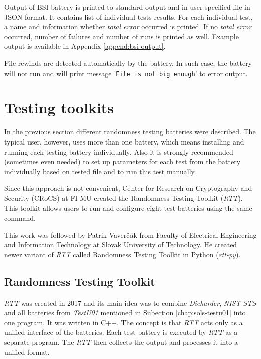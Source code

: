 \documentclass[
  digital,     %
  oneside,     %
  nosansbold,  %
  nocolorbold, %
  nolof,         %
  nolot,         %
]{fithesis4}
\begin{document}
Output of BSI battery is printed to standard output and in user-specified file in JSON format. It contains list of individual tests results. For each individual test, a name and information whether \emph{total error} occurred is printed. If no \emph{total error} occurred, number of failures and number of runs is printed as well. Example output is available in Appendix \ref{append:bsi-output}.

File rewinds are detected automatically by the battery. In such case, the battery will not run and will print message 
'\texttt{File is not big enough}' to error output.



\section{Testing toolkits}\label{chap:sols-toolkits}
In the previous section different randomness testing batteries were described. The typical user, however, uses more than one battery, which means installing and running each testing battery individually. Also it is strongly recommended (sometimes even needed) to set up parameters for each test from the battery individually based on tested file and to run this test manually.

Since this approach is not convenient, Center for Research on Cryptography and Security (CRoCS) at FI MU created the Randomness Testing Toolkit (\emph{RTT}). This toolkit allows users to run and configure eight test batteries using the same command.

This work was followed by Patrik Vaverčák from Faculty of Electrical Engineering and Information Technology at Slovak University of Technology. He created newer variant of \emph{RTT} called Randomness Testing Toolkit in Python (\emph{rtt-py}).

\subsection{Randomness Testing Toolkit} \label{chap:sols-rtt}

\emph{RTT} was created in 2017 and its main idea was to combine \emph{Dieharder}, \emph{NIST STS} and all batteries from \emph{TestU01} mentioned in Subection \ref{chap:sols-testu01} into one program. It was written in C++. The concept is that \emph{RTT} acts only as a unified interface of the batteries. Each test battery is executed by \emph{RTT} as a separate program. The \emph{RTT} then collects the output and processes it into a unified format.~\cite[p.~8]{rtt-obratil}
\end{document}
